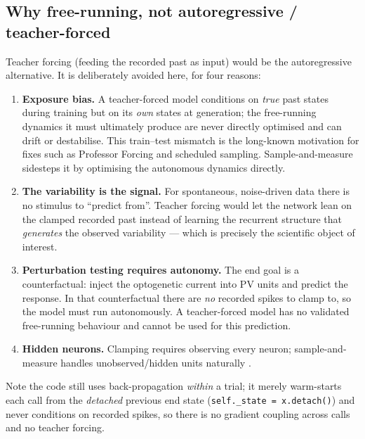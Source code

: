 \documentclass[11pt]{article}
\newcommand{\code}[1]{\texttt{#1}}
\begin{document}
\subsection{Why free-running, not autoregressive / teacher-forced}
Teacher forcing (feeding the recorded past as input) would be the autoregressive
alternative. It is deliberately avoided here, for four reasons:
\begin{enumerate}[leftmargin=1.8em]
\item \textbf{Exposure bias.} A teacher-forced model conditions on \emph{true}
past states during training but on its \emph{own} states at generation; the
free-running dynamics it must ultimately produce are never directly optimised and
can drift or destabilise. This train--test mismatch is the long-known motivation
for fixes such as Professor Forcing \cite{lamb2016} and scheduled sampling.
Sample-and-measure sidesteps it by optimising the autonomous dynamics directly.
\item \textbf{The variability is the signal.} For spontaneous, noise-driven data
there is no stimulus to ``predict from''. Teacher forcing would let the network
lean on the clamped recorded past instead of learning the recurrent structure
that \emph{generates} the observed variability --- which is precisely the
scientific object of interest.
\item \textbf{Perturbation testing requires autonomy.} The end goal is a
counterfactual: inject the optogenetic current into PV units and predict the
response. In that counterfactual there are \emph{no} recorded spikes to clamp to,
so the model must run autonomously. A teacher-forced model has no validated
free-running behaviour and cannot be used for this prediction.
\item \textbf{Hidden neurons.} Clamping requires observing every neuron;
sample-and-measure handles unobserved/hidden units naturally \cite{bellec2021}.
\end{enumerate}
Note the code still uses back-propagation \emph{within} a trial; it merely
warm-starts each call from the \emph{detached} previous end state
(\code{self.\_state = x.detach()}) and never conditions on recorded spikes, so
there is no gradient coupling across calls and no teacher forcing.
\end{document}
